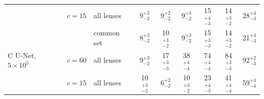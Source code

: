 \begin{tabular}{@{}lllcccccc@{}}
 & $c{=}15$ & all lenses & 9$^{+3}_{-2}$ & 9$^{+2}_{-2}$ & 9$^{+3}_{-2}$ & 15$^{+4}_{-3}$ & 14$^{+3}_{-2}$ & 28$^{+4}_{-3}$ \\
 &  & common set & 8$^{+3}_{-2}$ & 10$^{+3}_{-2}$ & 9$^{+3}_{-2}$ & 15$^{+3}_{-3}$ & 14$^{+3}_{-2}$ & 21$^{+4}_{-3}$ \\
\addlinespace[2pt]
C U-Net, $5{\times}10^{5}$ & $c{=}60$ & all lenses & 9$^{+3}_{-2}$ & 17$^{+3}_{-3}$ & 38$^{+4}_{-4}$ & 74$^{+4}_{-4}$ & 84$^{+3}_{-3}$ & 92$^{+2}_{-3}$ \\
 & $c{=}15$ & all lenses & 10$^{+3}_{-2}$ & 6$^{+2}_{-2}$ & 10$^{+3}_{-2}$ & 23$^{+4}_{-3}$ & 41$^{+4}_{-4}$ & 59$^{+4}_{-4}$ \\
\bottomrule
\end{tabular}
